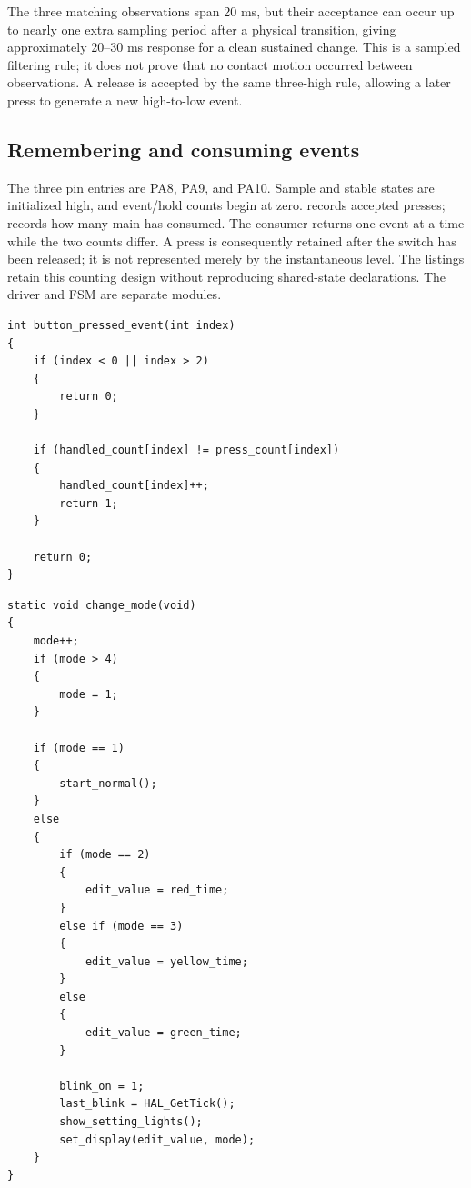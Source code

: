 \documentclass[a4paper]{article}
\newcommand{\code}[1]{\texttt{\detokenize{#1}}}
\newcommand{\topic}[1]{\subsection{#1}}
\begin{document}
The three matching observations span 20 ms, but their acceptance can occur
up to nearly one extra sampling period after a physical transition, giving
approximately 20--30 ms response for a clean sustained change. This is a
sampled filtering rule; it does not prove that no contact motion occurred
between observations. A release is accepted by the same three-high rule,
allowing a later press to generate a new high-to-low event.


\topic{Remembering and consuming events}
The three pin entries are PA8, PA9, and PA10. Sample and stable states are
initialized high, and event/hold counts begin at zero.
\code{press_count} records accepted presses; \code{handled_count} records
how many main has consumed. The consumer returns one event at a time while
the two counts differ. A press is consequently retained after the switch
has been released; it is not represented merely by the instantaneous level.
The listings retain this counting design without reproducing shared-state
declarations. The driver and FSM are separate modules.

\par\noindent\begin{minipage}{\linewidth}
\begin{lstlisting}[caption={Consuming a debounced press event}]
int button_pressed_event(int index)
{
    if (index < 0 || index > 2)
    {
        return 0;
    }

    if (handled_count[index] != press_count[index])
    {
        handled_count[index]++;
        return 1;
    }

    return 0;
}
\end{lstlisting}
\end{minipage}\par

\begin{lstlisting}[caption={Mode change and entry actions}]
static void change_mode(void)
{
    mode++;
    if (mode > 4)
    {
        mode = 1;
    }

    if (mode == 1)
    {
        start_normal();
    }
    else
    {
        if (mode == 2)
        {
            edit_value = red_time;
        }
        else if (mode == 3)
        {
            edit_value = yellow_time;
        }
        else
        {
            edit_value = green_time;
        }

        blink_on = 1;
        last_blink = HAL_GetTick();
        show_setting_lights();
        set_display(edit_value, mode);
    }
}
\end{lstlisting}
\end{document}
